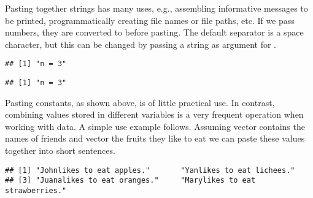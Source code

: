 \documentclass[krantz2]{krantz}\usepackage{knitr}
\begin{document}
Pasting together  strings has many uses, e.g., assembling informative messages to be printed, programmatically creating file names or file paths, etc. If we pass numbers, they are converted to  before pasting. The default separator is a space character, but this can be changed by passing a  string as argument for .

\begin{knitrout}\footnotesize
{}\color{fgcolor}\begin{kframe}
\begin{alltt}
\hlstd{(}\hlstd{,} \hlstd{)}
\end{alltt}
\begin{verbatim}
## [1] "n = 3"
\end{verbatim}
\begin{alltt}
\hlstd{(}\hlstd{,} \hlstd{,}  \hlstd{=} \hlstd{)}
\end{alltt}
\begin{verbatim}
## [1] "n = 3"
\end{verbatim}
\end{kframe}
\end{knitrout}

Pasting constants, as shown above,  is of little practical use. In contrast, combining values stored in different variables is a very frequent operation when working with data. A simple use example follows. Assuming vector  contains the names of friends and vector  the fruits they like to eat we can paste these values together into short sentences.

\begin{knitrout}\footnotesize
{}\color{fgcolor}\begin{kframe}
\begin{alltt}
 \hlkwb{<-} \hlstd{(}\hlstd{,} \hlstd{,} \hlstd{,} \hlstd{)}
 \hlkwb{<-} \hlstd{(}\hlstd{,} \hlstd{,} \hlstd{,} \hlstd{)}
  \hlstd{,}  \hlstd{=} \hlstd{)}
\end{alltt}
\begin{verbatim}
## [1] "Johnlikes to eat apples."       "Yanlikes to eat lichees."      
## [3] "Juanalikes to eat oranges."     "Marylikes to eat strawberries."
\end{verbatim}
\end{kframe}
\end{knitrout}
\end{document}
